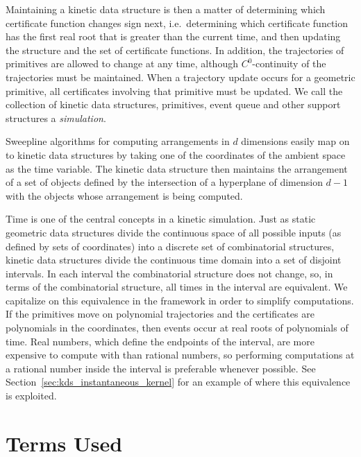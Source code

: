 Maintaining a kinetic data structure is then a matter of determining
which certificate function changes sign next, i.e.\ determining which
certificate function has the first real root that is greater than the
current time, and then updating the structure and the set of
certificate functions. In addition, the trajectories of primitives are
allowed to change at any time, although $C^0$-continuity of the
trajectories must be maintained.  When a trajectory update occurs for
a geometric primitive, all certificates involving that primitive must
be updated.  We call the collection of kinetic data structures,
primitives, event queue and other support structures a
{\em simulation}.

Sweepline algorithms for computing arrangements in $d$ dimensions
easily map on to kinetic data structures by taking one of the
coordinates of the ambient space as the time variable. The kinetic
data structure then maintains the arrangement of a set of objects
defined by the intersection of a hyperplane of dimension $d-1$ with
the objects whose arrangement is being computed. 


Time is one of the central concepts in a kinetic simulation.  Just as
static geometric data structures divide the continuous space of all
possible inputs (as defined by sets of coordinates) into a discrete
set of combinatorial structures, kinetic data structures divide the
continuous time domain into a set of disjoint intervals. In each
interval the combinatorial structure does not change, so, in terms of
the combinatorial structure, all times in the interval are equivalent.
We capitalize on this equivalence in the framework in order to
simplify computations. If the primitives move on polynomial
trajectories and the certificates are polynomials in the coordinates,
then events occur at real roots of polynomials of time. Real numbers,
which define the endpoints of the interval, are more expensive to
compute with than rational numbers, so performing computations at a
rational number inside the interval is preferable whenever
possible. See Section~\ref{sec:kds_instantaneous_kernel} for an example of
where this equivalence is exploited.

\section{Terms Used}
\label{sec:kds_terms}

